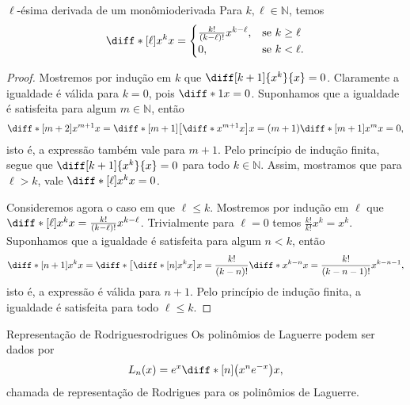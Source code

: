 \begin{lemma}{\(\ell\)-ésima derivada de um monômio}{derivada}
    Para \(k, \ell \in \mathbb{N}\), temos
    \begin{equation*}
        \diff*[\ell]{x^k}{x} = \begin{cases}
            \frac{k!}{(k - \ell)!} x^{k - \ell}, &\text{se }k \geq \ell\\
            0, &\text{se }k < \ell.
        \end{cases}
    \end{equation*}
\end{lemma}
\begin{proof}
    Mostremos por indução em \(k\) que \(\diff[k+1]{x^{k}}{x}= 0\). Claramente a igualdade é válida para \(k = 0\), pois \(\diff*{1}{x} = 0\). Suponhamos que a igualdade é satisfeita para algum \(m \in \mathbb{N}\), então
    \begin{equation*}
        \diff*[m+2]{x^{m+1}}{x} = \diff*[m+1]{\left[\diff*{x^{m+1}}{x}\right]}{x} = (m+1)\diff*[m+1]{x^m}{x} = 0,
    \end{equation*}
    isto é, a expressão também vale para \(m + 1\). Pelo princípio de indução finita, segue que \(\diff[k+1]{x^{k}}{x}= 0\) para todo \(k \in \mathbb{N}\). Assim, mostramos que para \(\ell > k\), vale \(\diff*[\ell]{x^k}{x} = 0\).

    Consideremos agora o caso em que \(\ell \leq k\). Mostremos por indução em \(\ell\) que \(\diff*[\ell]{x^k}{x} = \frac{k!}{(k-\ell)!}x^{k - \ell}\). Trivialmente para \(\ell = 0\) temos \(\frac{k!}{k!} x^k = x^k\). Suponhamos que a igualdade é satisfeita para algum \(n < k\), então
    \begin{equation*}
        \diff*[n+1]{x^k}{x} = \diff*{\left[\diff*[n]{x^k}{x}\right]}{x} = \frac{k!}{(k - n)!} \diff*{x^{k-n}}{x} = \frac{k!}{(k-n-1)!}x^{k-n-1},
    \end{equation*}
    isto é, a expressão é válida para \(n + 1\). Pelo princípio de indução finita, a igualdade é satisfeita para todo \(\ell \leq k\).
\end{proof}
\begin{proposition}{Representação de Rodrigues}{rodrigues}
    Os polinômios de Laguerre podem ser dados por
    \begin{equation*}
        L_n(x) = e^x \diff*[n]{\left(x^ne^{-x}\right)}{x},
    \end{equation*}
    chamada de representação de Rodrigues para os polinômios de Laguerre.
\end{proposition}
